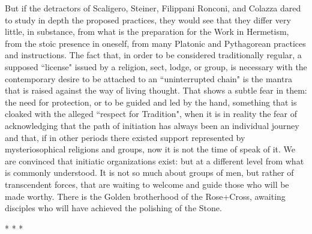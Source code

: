 But if the detractors of Scaligero, Steiner, Filippani Ronconi, and Colazza dared to study in depth the proposed practices, they would see that they differ very little, in substance, from what is the preparation for the Work in Hermetism, from the stoic presence in oneself, from many Platonic and Pythagorean practices and instructions. The fact that, in order to be considered traditionally regular, a supposed ``license" issued by a religion, sect, lodge, or group, is necessary with the contemporary desire to be attached to an ``uninterrupted chain" is the mantra that is raised against the way of living thought. That shows a subtle fear in them: the need for protection, or to be guided and led by the hand, something that is cloaked with the alleged ``respect for Tradition", when it is in reality the fear of acknowledging that the path of initiation has always been an individual journey and that, if in other periods there existed support represented by mysteriosophical religions and groups, now it is not the time of speak of it. We are convinced that initiatic organizations exist: but at a different level from what is commonly understood. It is not so much about groups of men, but rather of transcendent forces, that are waiting to welcome and guide those who will be made worthy. There is the Golden brotherhood of the Rose+Cross, awaiting disciples who will have achieved the polishing of the Stone.




\begin{center}* * *\end{center}

